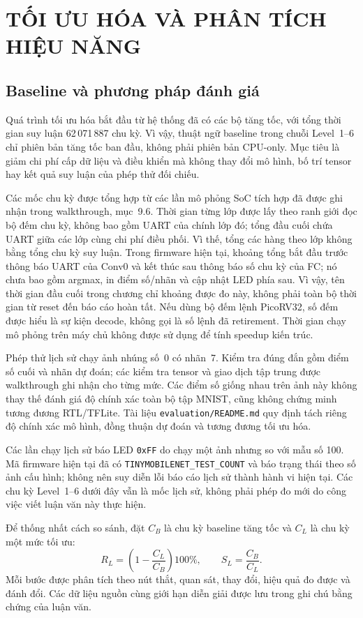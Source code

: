 \chapter{TỐI ƯU HÓA VÀ PHÂN TÍCH HIỆU NĂNG}
\label{chap:toiuu}
\section{Baseline và phương pháp đánh giá}
Quá trình tối ưu hóa bắt đầu từ hệ thống đã có các bộ tăng tốc, với tổng thời gian suy luận 62\,071\,887 chu kỳ. Vì vậy, thuật ngữ baseline trong chuỗi Level~1--6 chỉ phiên bản tăng tốc ban đầu, không phải phiên bản CPU-only. Mục tiêu là giảm chi phí cấp dữ liệu và điều khiển mà không thay đổi mô hình, bố trí tensor hay kết quả suy luận của phép thử đối chiếu.

Các mốc chu kỳ được tổng hợp từ các lần mô phỏng SoC tích hợp đã được ghi nhận trong walkthrough, mục~9.6. Thời gian từng lớp được lấy theo ranh giới đọc bộ đếm chu kỳ, không bao gồm UART của chính lớp đó; tổng đầu cuối chứa UART giữa các lớp cùng chi phí điều phối. Vì thế, tổng các hàng theo lớp không bằng tổng chu kỳ suy luận. Trong firmware hiện tại, khoảng tổng bắt đầu trước thông báo UART của Conv0 và kết thúc sau thông báo số chu kỳ của FC; nó chưa bao gồm argmax, in điểm số/nhãn và cập nhật LED phía sau. Vì vậy, tên thời gian đầu cuối trong chương chỉ khoảng được đo này, không phải toàn bộ thời gian từ reset đến báo cáo hoàn tất. Nếu dùng bộ đếm lệnh PicoRV32, số đếm được hiểu là sự kiện decode, không gọi là số lệnh đã retirement. Thời gian chạy mô phỏng trên máy chủ không được sử dụng để tính speedup kiến trúc.

Phép thử lịch sử chạy ảnh nhúng số~0 có nhãn~7. Kiểm tra đúng đắn gồm điểm số cuối và nhãn dự đoán; các kiểm tra tensor và giao dịch tập trung được walkthrough ghi nhận cho từng mức. Các điểm số giống nhau trên ảnh này không thay thế đánh giá độ chính xác toàn bộ tập MNIST, cũng không chứng minh tương đương RTL/TFLite. Tài liệu \texttt{evaluation/README.md} quy định tách riêng độ chính xác mô hình, đồng thuận dự đoán và tương đương tối ưu hóa.

Các lần chạy lịch sử báo LED \texttt{0xFF} do chạy một ảnh nhưng so với mẫu số 100. Mã firmware hiện tại đã có \texttt{TINYMOBILENET\_TEST\_COUNT} và báo trạng thái theo số ảnh cấu hình; không nên suy diễn lỗi báo cáo lịch sử thành hành vi hiện tại. Các chu kỳ Level~1--6 dưới đây vẫn là mốc lịch sử, không phải phép đo mới do công việc viết luận văn này thực hiện.

Để thống nhất cách so sánh, đặt $C_B$ là chu kỳ baseline tăng tốc và $C_L$ là chu kỳ một mức tối ưu:
\begin{equation}
 R_L=\left(1-\frac{C_L}{C_B}\right)100\%,\qquad
 S_L=\frac{C_B}{C_L}.
\end{equation}
Mỗi bước được phân tích theo nút thắt, quan sát, thay đổi, hiệu quả đo được và đánh đổi. Các dữ liệu nguồn cùng giới hạn diễn giải được lưu trong ghi chú bằng chứng của luận văn.

